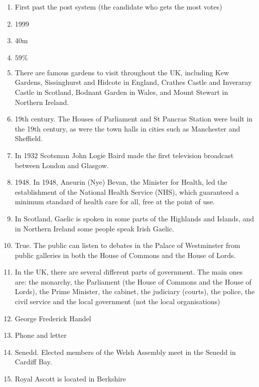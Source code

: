 \documentclass{amsart}
\begin{document}
\begin{enumerate}
 \item First past the post system (the candidate who gets the most votes)
 \item 1999
 \item 40m
 \item $59\%$
 \item There are famous gardens to visit throughout the UK, including Kew Gardens, Sissinghurst and Hidcote in England, Crathes Castle and Inveraray Castle in Scotland, Bodnant Garden in Wales, and Mount Stewart in Northern Ireland.
 \item 19th century. The Houses of Parliament and St Pancras Station were built in the 19th century, as were the town halls in cities such as Manchester and Sheffield.
 \item In 1932 Scotsman John Logie Baird made the first television broadcast between London and Glasgow.
 \item 1948. In 1948, Aneurin (Nye) Bevan, the Minister for Health, led the establishment of the National Health Service (NHS), which guaranteed a minimum standard of health care for all, free at the point of use.
 \item In Scotland, Gaelic is spoken in some parts of the Highlands and Islands, and in Northern Ireland some people speak Irish Gaelic.
 \item True. The public can listen to debates in the Palace of Westminster from public galleries in both the House of Commons and the House of Lords.
 \item In the UK, there are several different parts of government. The main ones are: the monarchy, the Parliament (the House of Commons and the House of Lords),  the Prime Minister, the cabinet, the judiciary (courts), the police, the civil service and the local government (not the local organisations)
 \item George Frederick Handel 
 \item Phone and letter
 \item Senedd. Elected members of the Welsh Assembly meet in the Senedd in Cardiff Bay.
 \item Royal Ascott is located in Berkshire
\end{enumerate}
\end{document}
